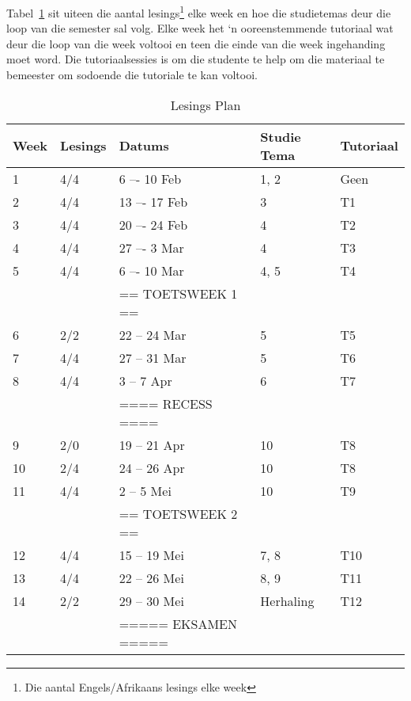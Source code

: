         Tabel~\ref{tab:lec_plan} sit uiteen die aantal lesings\footnote{Die
        aantal Engels/Afrikaans lesings elke week} elke week en hoe die
        studietemas deur die loop van die semester sal volg. Elke week het `n
        ooreenstemmende tutoriaal wat deur die loop van die week voltooi en
        teen die einde van die week ingehanding moet word. Die
        tutoriaalsessies is om die studente te help om die materiaal te
        bemeester om sodoende die tutoriale te kan voltooi.

        \begin{table}[!h]
            \begin{center}
             \begin{tabular}{|l|l|l|l|l|}
                 \hline
                 {\bf Week} & {\bf Lesings} & {\bf Datums} & %
                 {\bf Studie Tema} & {\bf Tutoriaal} \\
                 \hline
                 1  & 4/4   &  6 –- 10 Feb      & 1, 2  & Geen \\
                 2  & 4/4   & 13 –- 17 Feb      & 3     & T1 \\
                 3  & 4/4   & 20 –- 24 Feb      & 4     & T2 \\
                 4  & 4/4   & 27 –-  3 Mar      & 4     & T3 \\
                 5  & 4/4   &  6 –- 10 Mar      & 4, 5  & T4 \\
                    &       & == TOETSWEEK 1 == &       & \\
                 6  & 2/2   & 22 -- 24 Mar      & 5     & T5 \\
                 7  & 4/4   & 27 -- 31 Mar      & 5     & T6 \\
                 8  & 4/4   &  3 --  7 Apr      & 6     & T7 \\
                    &       & ==== RECESS ====  &       & \\
                 9  & 2/0   & 19 -- 21 Apr      & 10    & T8 \\
                 10 & 2/4   & 24 -- 26 Apr      & 10    & T8 \\
                 11 & 4/4   &  2 --  5 Mei      & 10    & T9 \\
                    &       & == TOETSWEEK 2 == &       & \\
                 12 & 4/4   & 15 -- 19 Mei      & 7, 8  & T10 \\
                 13 & 4/4   & 22 -- 26 Mei      & 8, 9  & T11 \\
                 14 & 2/2   & 29 -- 30 Mei      & Herhaling & T12 \\
                    &       & ===== EKSAMEN ===== &       & \\
                 \hline
             \end{tabular}
             \caption{Lesings Plan} \label{tab:lec_plan}
            \end{center}
        \end{table}


